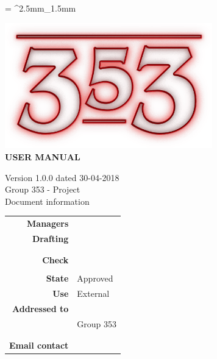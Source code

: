 \documentclass[openany, a4paper, 12pt]{report}
\begin{document}
	
	\tabulinesep = ^2.5mm_1.5mm
	
	\begin{titlepage}
		\centering
		\vfill
		{
			\bfseries
			\vskip2cm
			\includegraphics[width=9cm]{../../common/images/logo.png} \\
			\vfill
			\Huge{USER MANUAL}\\
			\vfill

			\Large Version 1.0.0 dated 30-04-2018\\ 
			\large Group 353 - Project \progetto \\
			\vfill
			\normalsize Document information\\
			\begin{table}[htbp]
				\centering
				\renewcommand\arraystretch{1.2}
				\begin{tabular}{r|l}
					\hline

					\textbf{Managers}		& \Gianluca \\
					
					\textbf{Drafting} 		& \Davide \\
											& \Valentina \\
											& \Riccardo \\
											
					\textbf{Check} 			& \Mirco \\	
											& \Parwinder \\
											
					\textbf{State} 			& Approved\\
					\textbf{Use}			& External\\
					\textbf{Addressed to}   & \Proponente\\
										& Group 353\\
										& \Vardanega\\
										& \Cardin\\
					
					\textbf{Email contact}	& \mailgroup
				\end{tabular}
			\end{table}
			\vfill
		}    
	\end{titlepage}
	
	\renewcommand{\contentsname}{Index}
	\tableofcontents
	\renewcommand{\listfigurename}{List of Figures}
	\listoffigures
	\newpage
	
	
	
	
	
	
	
	
	
\end{document}

